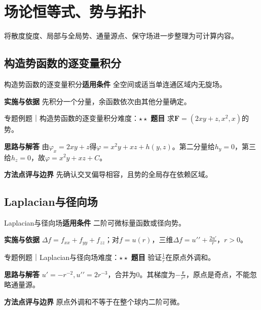 \section{场论恒等式、势与拓扑}\label{mat:fields}
\begin{examtip}将散度旋度、局部与全局势、通量源点、保守场进一步整理为可计算内容。\end{examtip}
\subsection{构造势函数的逐变量积分}\label{mat:fields:potential}
\begin{method}{构造势函数的逐变量积分}\textbf{适用条件} 全空间或适当单连通区域内无旋场。\par\textbf{实施与依据} 先积分一个分量，余函数依次由其他分量确定。\end{method}
\begin{example}{专题例题｜构造势函数的逐变量积分}{难度：$\star\star$}
\textbf{题目} 求$\bm F=(2xy+z,x^2, x)$的势。\par\textbf{思路与解答} 由$\varphi_x=2xy+z$得$\varphi=x^2y+xz+h(y,z)$。第二分量给$h_y=0$，第三给$h_z=0$，故$\varphi=x^2y+xz+C$。\par\textbf{方法点评与边界} 先确认交叉偏导相容，且势的全局存在依赖区域。
\end{example}
\subsection{Laplacian与径向场}\label{mat:fields:laplacian}
\begin{method}{Laplacian与径向场}\textbf{适用条件} 二阶可微标量函数或径向势。\par\textbf{实施与依据} $\Delta f=f_{xx}+f_{yy}+f_{zz}$；对$f=u(r)$，三维$\Delta f=u\prime\prime+\frac{2u\prime}{r}$，$r>0$。\end{method}
\begin{example}{专题例题｜Laplacian与径向场}{难度：$\star\star$}
\textbf{题目} 验证$\frac{1}{r}$在原点外调和。\par\textbf{思路与解答} $u\prime=-r^{-2},u\prime\prime=2r^{-3}$，合并为0。其梯度为$-\frac{\bm r}{r^3}$，原点是奇点，不能忽略通量源。\par\textbf{方法点评与边界} 原点外调和不等于在整个球内二阶可微。
\end{example}
